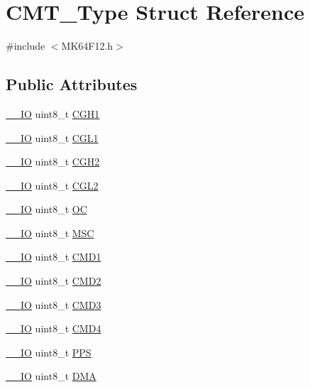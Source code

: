 \hypertarget{structCMT__Type}{}\section{C\+M\+T\+\_\+\+Type Struct Reference}
\label{structCMT__Type}


{\ttfamily \#include $<$M\+K64\+F12.\+h$>$}

\subsection*{Public Attributes}
\begin{DoxyCompactItemize}
\item 
\hyperlink{core__sc300_8h_aec43007d9998a0a0e01faede4133d6be}{\+\_\+\+\_\+\+IO} uint8\+\_\+t \hyperlink{structCMT__Type_ad524e322f0e41a4ffa7c5fb78f097599}{C\+G\+H1}
\item 
\hyperlink{core__sc300_8h_aec43007d9998a0a0e01faede4133d6be}{\+\_\+\+\_\+\+IO} uint8\+\_\+t \hyperlink{structCMT__Type_abeb8346ceedb3fb02c02cb4c43a0c31d}{C\+G\+L1}
\item 
\hyperlink{core__sc300_8h_aec43007d9998a0a0e01faede4133d6be}{\+\_\+\+\_\+\+IO} uint8\+\_\+t \hyperlink{structCMT__Type_aa231bd31f31832203a910c65148d6939}{C\+G\+H2}
\item 
\hyperlink{core__sc300_8h_aec43007d9998a0a0e01faede4133d6be}{\+\_\+\+\_\+\+IO} uint8\+\_\+t \hyperlink{structCMT__Type_ad5ddf20a0c59f22da1def98165827ae6}{C\+G\+L2}
\item 
\hyperlink{core__sc300_8h_aec43007d9998a0a0e01faede4133d6be}{\+\_\+\+\_\+\+IO} uint8\+\_\+t \hyperlink{structCMT__Type_a6cde86fd27edc5afb37125c287441749}{OC}
\item 
\hyperlink{core__sc300_8h_aec43007d9998a0a0e01faede4133d6be}{\+\_\+\+\_\+\+IO} uint8\+\_\+t \hyperlink{structCMT__Type_ad5c3e74ab287959da1599060c679921d}{M\+SC}
\item 
\hyperlink{core__sc300_8h_aec43007d9998a0a0e01faede4133d6be}{\+\_\+\+\_\+\+IO} uint8\+\_\+t \hyperlink{structCMT__Type_aba5e9b2b5339e8d9a41aaedd54fbd21b}{C\+M\+D1}
\item 
\hyperlink{core__sc300_8h_aec43007d9998a0a0e01faede4133d6be}{\+\_\+\+\_\+\+IO} uint8\+\_\+t \hyperlink{structCMT__Type_aabbd5d0c8076482098448e7edbde4cf3}{C\+M\+D2}
\item 
\hyperlink{core__sc300_8h_aec43007d9998a0a0e01faede4133d6be}{\+\_\+\+\_\+\+IO} uint8\+\_\+t \hyperlink{structCMT__Type_a1baaa54d95afb3bf83179634f691a3f0}{C\+M\+D3}
\item 
\hyperlink{core__sc300_8h_aec43007d9998a0a0e01faede4133d6be}{\+\_\+\+\_\+\+IO} uint8\+\_\+t \hyperlink{structCMT__Type_a66c3bacb73c9dd2584e77ba8414deb4a}{C\+M\+D4}
\item 
\hyperlink{core__sc300_8h_aec43007d9998a0a0e01faede4133d6be}{\+\_\+\+\_\+\+IO} uint8\+\_\+t \hyperlink{structCMT__Type_a1be46f15eb27794c060113a409fce3ac}{P\+PS}
\item 
\hyperlink{core__sc300_8h_aec43007d9998a0a0e01faede4133d6be}{\+\_\+\+\_\+\+IO} uint8\+\_\+t \hyperlink{structCMT__Type_a691ca71ac3ecfde5c5f2c9ed46f96338}{D\+MA}
\end{DoxyCompactItemize}


